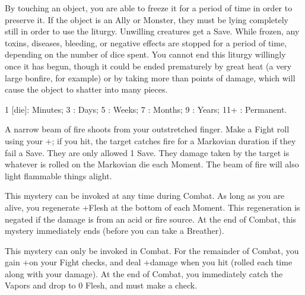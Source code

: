 {\MYSTERY [
  Name = Preserve,
  Link = arcana-mystery-preserve,
  Paradigm = Elements,
  Save = Y (neg.),
  Duration = varies,
  Target = Close Target(s)
]

By touching an object, you are able to freeze it for a period of time in order to preserve it.  If the object is an Ally or Monster, they must be lying completely still in order to use the liturgy.  Unwilling creatures get a Save.  While frozen, any toxins, diseases, bleeding, or negative effects are stopped for a period of time, depending on the number of dice spent.  You cannot end this liturgy willingly once it has begun, though it could be ended prematurely by great heat (a very large bonfire, for example) or by taking more than \SUMDICE points of damage, which will cause the object to shatter into many pieces.  

1 [die]: Minutes; 3 \DICE: Days; 5 \DICE: Weeks; 7 \DICE: Months; 9 \DICE: Years; 11+ \DICE: Permanent. 

\MYSTERY [
  Name = Ray of Fire,
  Link = arcana-mystery-ray-of-fire,
  Paradigm = Elements,
  Save = Y (neg.),
  Duration = Instant,
  Target = Nearby or Far-Away Target(s)
]

A narrow beam of fire shoots from your outstretched finger.  Make a Fight roll using your \FOC+\DICE; if you hit, the target catches fire for a Markovian duration if they fail a Save.  They are only allowed 1 Save.  They damage taken by the target is whatever is rolled on the Markovian die each Moment.  The beam of fire will also light flammable things alight.

\MYSTERY [
  Name = Trollblood,
  Link = arcana-mystery-trollblood,
  Paradigm = Death,
  Save = n/a,
  Duration = Combat,
  Target = Self
]

This mystery can be invoked at any time during Combat.  As long as you are alive, you regenerate +\DICE Flesh at the bottom of each Moment.  This regeneration is negated if the damage is from an acid or fire source. At the end of Combat, this mystery immediately ends (before you can take a Breather).

\MYSTERY [
  Name = Witness Me,
  Link = arcana-mystery-witness-me,
  Paradigm = Death,
  Save = n/a,
  Duration = Combat,
  Target = Self
]

This mystery can only be invoked in Combat.  For the remainder of Combat, you gain +\DICE on your Fight checks, and deal +\SUMDICE damage when you hit (rolled each time along with your damage).  At the end of Combat, you immediately catch the Vapors and drop to 0 Flesh, and must make a \DEATH check.

}
